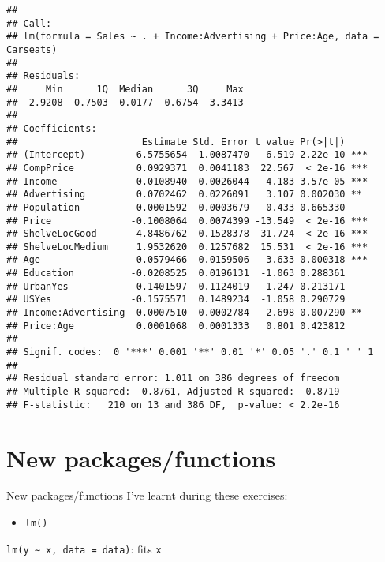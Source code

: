 \documentclass[]{article}
\newenvironment{Shaded}{\begin{snugshade}}{\end{snugshade}}
\newcommand{\CommentTok}[1]{\textcolor[rgb]{0.56,0.35,0.01}{\textit{#1}}}
\providecommand{\tightlist}{%
  \setlength{\itemsep}{0pt}\setlength{\parskip}{0pt}}
\begin{document}
\begin{verbatim}
## 
## Call:
## lm(formula = Sales ~ . + Income:Advertising + Price:Age, data = Carseats)
## 
## Residuals:
##     Min      1Q  Median      3Q     Max 
## -2.9208 -0.7503  0.0177  0.6754  3.3413 
## 
## Coefficients:
##                      Estimate Std. Error t value Pr(>|t|)    
## (Intercept)         6.5755654  1.0087470   6.519 2.22e-10 ***
## CompPrice           0.0929371  0.0041183  22.567  < 2e-16 ***
## Income              0.0108940  0.0026044   4.183 3.57e-05 ***
## Advertising         0.0702462  0.0226091   3.107 0.002030 ** 
## Population          0.0001592  0.0003679   0.433 0.665330    
## Price              -0.1008064  0.0074399 -13.549  < 2e-16 ***
## ShelveLocGood       4.8486762  0.1528378  31.724  < 2e-16 ***
## ShelveLocMedium     1.9532620  0.1257682  15.531  < 2e-16 ***
## Age                -0.0579466  0.0159506  -3.633 0.000318 ***
## Education          -0.0208525  0.0196131  -1.063 0.288361    
## UrbanYes            0.1401597  0.1124019   1.247 0.213171    
## USYes              -0.1575571  0.1489234  -1.058 0.290729    
## Income:Advertising  0.0007510  0.0002784   2.698 0.007290 ** 
## Price:Age           0.0001068  0.0001333   0.801 0.423812    
## ---
## Signif. codes:  0 '***' 0.001 '**' 0.01 '*' 0.05 '.' 0.1 ' ' 1
## 
## Residual standard error: 1.011 on 386 degrees of freedom
## Multiple R-squared:  0.8761, Adjusted R-squared:  0.8719 
## F-statistic:   210 on 13 and 386 DF,  p-value: < 2.2e-16
\end{verbatim}

\begin{Shaded}
\end{Shaded}

\hypertarget{new-packagesfunctions}{%
\section{New packages/functions}\label{new-packagesfunctions}}

New packages/functions I've learnt during these exercises:

\begin{itemize}
\tightlist
\item
  \texttt{lm()}
\end{itemize}

\texttt{lm(y\ ∼\ x,\ data\ =\ data)}: fits \texttt{x}
\end{document}
